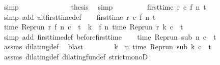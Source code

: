 \begin{isabellebody}
\ simp\isanewline
\ \ \ \ \ \ \isamarkupfalse%
\isanewline
\ \ \ \ \isacommand{{\isacharbraceright}}\isamarkupfalse%
\ \isamarkupfalse%
\ {\isacharquery}thesis\ \isamarkupfalse%
\ simp\isanewline
\ \ \isamarkupfalse%
\isanewline
\ \ \isamarkupfalse%
\ {\isacharasterisk}{\isacharasterisk}\ \isamarkupfalse%
\ {\isacartoucheopen}first{\isacharunderscore}time\ r\ c\ {\isacharparenleft}f\ n{\isacharparenright}\ t{\isacartoucheclose}\ \isamarkupfalse%
\ {\isacharparenleft}simp\ add{\isacharcolon}\ alt{\isacharunderscore}first{\isacharunderscore}time{\isacharunderscore}def{\isacharparenright}\isanewline
{}\isamarkupfalse%
\isanewline
\ \ \isamarkupfalse%
\ {\isacartoucheopen}first{\isacharunderscore}time\ r\ c\ {\isacharparenleft}f\ n{\isacharparenright}\ t{\isacartoucheclose}\isanewline
\ \ \isamarkupfalse%
\ {\isacharasterisk}{\isacharcolon}{\isacartoucheopen}time\ {\isacharparenleft}{\isacharparenleft}Rep{\isacharunderscore}run\ r{\isacharparenright}\ {\isacharparenleft}f\ n{\isacharparenright}\ c{\isacharparenright}\ {\isacharequal}\ t\ {\isasymand}\ {\isacharparenleft}{\isasymforall}k\ {\isacharless}\ f\ n{\isachardot}\ time\ {\isacharparenleft}{\isacharparenleft}Rep{\isacharunderscore}run\ r{\isacharparenright}\ k\ c{\isacharparenright}\ {\isacharless}\ t{\isacharparenright}{\isacartoucheclose}\isanewline
\ \ \ \ \isamarkupfalse%
\ {\isacharparenleft}simp\ add{\isacharcolon}\ first{\isacharunderscore}time{\isacharunderscore}def\ before{\isacharunderscore}first{\isacharunderscore}time{\isacharparenright}\isanewline
\ \ \isamarkupfalse%
\ {\isacartoucheopen}time\ {\isacharparenleft}{\isacharparenleft}Rep{\isacharunderscore}run\ sub{\isacharparenright}\ n\ c{\isacharparenright}\ {\isacharequal}\ t{\isacartoucheclose}\ \isamarkupfalse%
\ assms\ dilating{\isacharunderscore}def\ \isamarkupfalse%
\ blast\isanewline
\ \ \isamarkupfalse%
\ \isamarkupfalse%
\ {\isacharasterisk}\ \isamarkupfalse%
\ {\isacartoucheopen}{\isacharparenleft}{\isasymforall}k\ {\isacharless}\ n{\isachardot}\ time\ {\isacharparenleft}{\isacharparenleft}Rep{\isacharunderscore}run\ sub{\isacharparenright}\ k\ c{\isacharparenright}\ {\isacharless}\ t{\isacharparenright}{\isacartoucheclose}\isanewline
\ \ \ \ \isamarkupfalse%
\ assms\ dilating{\isacharunderscore}def\ dilating{\isacharunderscore}fun{\isacharunderscore}def\ strict{\isacharunderscore}monoD\ \isamarkupfalse%

\end{isabellebody}
